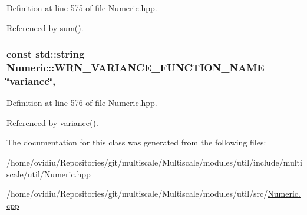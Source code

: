 Definition at line 575 of file Numeric.\-hpp.



Referenced by sum().

\hypertarget{classmultiscale_1_1Numeric_a39cf0319c0ad0a4ce7d0a348cd6bfa71}{
\subsubsection[{W\-R\-N\-\_\-\-V\-A\-R\-I\-A\-N\-C\-E\-\_\-\-F\-U\-N\-C\-T\-I\-O\-N\-\_\-\-N\-A\-M\-E}]{\setlength{\rightskip}{0pt plus 5cm}const std\-::string Numeric\-::\-W\-R\-N\-\_\-\-V\-A\-R\-I\-A\-N\-C\-E\-\_\-\-F\-U\-N\-C\-T\-I\-O\-N\-\_\-\-N\-A\-M\-E = \char`\"{}variance\char`\"{}\hspace{0.3cm}{\ttfamily [static]}, {\ttfamily [private]}}}\label{classmultiscale_1_1Numeric_a39cf0319c0ad0a4ce7d0a348cd6bfa71}


Definition at line 576 of file Numeric.\-hpp.



Referenced by variance().



The documentation for this class was generated from the following files\-:\begin{DoxyCompactItemize}
\item 
/home/ovidiu/\-Repositories/git/multiscale/\-Multiscale/modules/util/include/multiscale/util/\hyperlink{Numeric_8hpp}{Numeric.\-hpp}\item 
/home/ovidiu/\-Repositories/git/multiscale/\-Multiscale/modules/util/src/\hyperlink{Numeric_8cpp}{Numeric.\-cpp}\end{DoxyCompactItemize}
